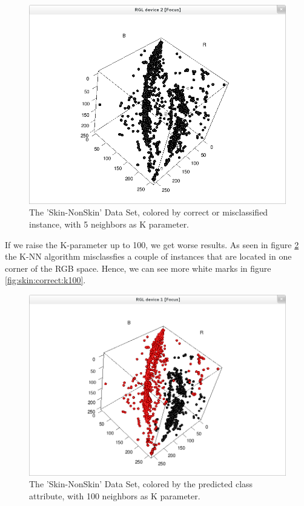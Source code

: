 \documentclass[paper=a4, fontsize=11pt]{scrartcl} %
\numberwithin{equation}{section} %
\numberwithin{figure}{section} %
\numberwithin{table}{section} %
\begin{document}
\begin{figure}[\textwidth]
    \begin{center}
\includegraphics[width=\textwidth]{Skin_correct_k5}
    \end{center}
\caption['Skin-NonSkin' correctness with k=5]{The 'Skin-NonSkin' Data Set, colored by correct or misclassified instance, with 5 neighbors as K parameter.}
\label{fig:skin:correct:k5}
\end{figure}

If we raise the K-parameter up to 100, we get worse results. As seen in figure \ref{fig:skin:predicted:k100} the K-NN algorithm misclassfies a couple of instances that are located in one corner of the RGB space. Hence, we can see more white marks in figure \ref{fig:skin:correct:k100}.

\begin{figure}[\textwidth]
    \begin{center}
\includegraphics[width=\textwidth]{Skin_predicted_k100}
    \end{center}
\caption['Skin-NonSkin' prediction with k=100]{The 'Skin-NonSkin' Data Set, colored by the predicted class attribute, with 100 neighbors as K parameter.}
\label{fig:skin:predicted:k100}
\end{figure}
\end{document}
